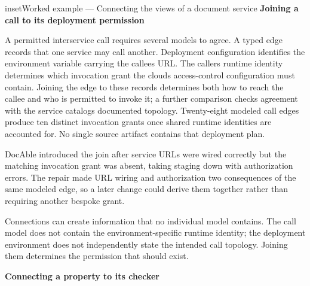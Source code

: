 \begin{bookbox}{inset}{Worked example --- Connecting the views of a document service}
\textbf{Joining a call to its deployment permission}


A permitted interservice call requires several models to agree. A typed edge records that one service may call another. Deployment configuration identifies the environment variable carrying the callee\textquotesingle s URL. The caller\textquotesingle s runtime identity determines which invocation grant the cloud\textquotesingle s access-control configuration must contain. Joining the edge to these records determines both how to reach the callee and who is permitted to invoke it; a further comparison checks agreement with the service catalog\textquotesingle s documented topology. Twenty-eight modeled call edges produce ten distinct invocation grants once shared runtime identities are accounted for. No single source artifact contains that deployment plan.

DocAble introduced the join after service URLs were wired correctly but the matching invocation grant was absent, taking staging down with authorization errors. The repair made URL wiring and authorization two consequences of the same modeled edge, so a later change could derive them together rather than requiring another bespoke grant.


Connections can create information that no individual model contains. The call model does not contain the environment-specific runtime identity; the deployment environment does not independently state the intended call topology. Joining them determines the permission that should exist.

\textbf{Connecting a property to its checker}



\end{bookbox}
